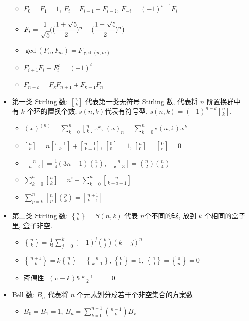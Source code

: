 \documentclass[landscape,a4paper]{article}
\newcommand{\stlf}[2]{\genfrac{ [ }{ ] }{0pt}{}{#1}{#2}}
\newcommand{\stls}[2]{\genfrac{ \{ }{ \} }{0pt}{}{#1}{#2}}
\begin{document}
\begin{spacing}{0.3}
\begin{multicols}{2}
\begin{itemize}
\begin{itemize}
  \item $F_0 = F_1 = 1$, $F_i = F_{i - 1} + F_{i - 2}$, $F_{-i} = (-1) ^ {i - 1} F_i$
  \item $F_i = \cfrac{1}{\sqrt{5}} ((\cfrac{1 + \sqrt{5}}{2}) ^ n - (\cfrac{1 - \sqrt{5}}{2}) ^ {n}) $
  \item $\gcd(F_n,F_m)=F_{\gcd(n,m)}$
  \item $F_{i + 1} F_i - F_i^2 = (-1) ^ i$
  \item $F_{n + k} = F_k F_{n + 1} + F_{k - 1} F_n$
  \end{itemize}
\item 第一类 Stirling 数: $\stlf{n}{k}$ 代表第一类无符号 Stirling 数, 代表将 $n$ 阶置换群中有 $k$ 个环的置换个数; $s(n,k)$代表有符号型, $s(n, k) = (-1)^{n - k}\stlf{n}{k}$.
  \begin{itemize}
  \item $(x)^{(n)} = \sum\limits_{k = 0}^{n}\stlf{n}{k}x ^k$, $(x)_{n} = \sum\limits_{k = 0}^{n} s(n, k) x ^k$
  \item $\stlf{n}{k} = n\stlf{n - 1}{k} + \stlf{n - 1}{k - 1}$, $\stlf{0}{0} = 1$, $\stlf{n}{0} = \stlf{0}{n} = 0$
  \item $\stlf{n}{n - 2} = \frac{1}{4} (3n - 1) \binom{n}{3} $, $\stlf{n}{n - 3} = \binom{n}{2} \binom{n}{4} $
  \item $\sum\limits_{k = 0}^{a}\stlf{n}{k} = n! - \sum\limits_{k = 0}^{n} \stlf{n}{k + a + 1}$
  \item $\sum\limits_{p = k}^{n}\stlf{n}{p}\binom{p}{k} = \stlf{n + 1}{k + 1}$
  \end{itemize}
\item 第二类 Stirling 数: $\stls{n}{k} = S(n, k)$ 代表 $n$个不同的球, 放到 $k$ 个相同的盒子里, 盒子非空.
  \begin{itemize}
  \item $\stls{n}{k} = \frac{1}{k!} \sum\limits_{j = 0}^{k} (-1)^j \binom{k}{j} (k - j)^n$
  \item $\stls{n + 1}{k} = k\stls{n}{k} + \stls{n}{k - 1}$, $\stls{0}{0} = 1$, $\stls{n}{0} = \stls{0}{n} = 0$
  \item 奇偶性: $(n - k) \& \frac{k - 1}{2} == 0$
  \end{itemize}
\item Bell 数: $B_n$ 代表将 $n$ 个元素划分成若干个非空集合的方案数
  \begin{itemize}
  \item $B_0 = B_1 = 1$, $B_n = \sum\limits_{k = 0}^{n - 1} \binom{n - 1}{k} B_k$

\end{itemize}
\end{itemize}
\end{multicols}
\end{spacing}
\end{document}
